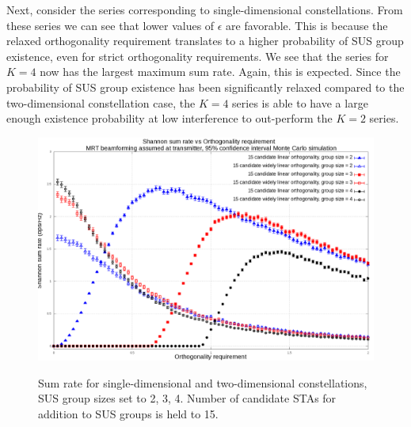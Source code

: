 Next, consider the series corresponding to single-dimensional constellations. From these series we can see that lower values of $\epsilon$ are favorable. This is because the relaxed orthogonality requirement translates to a higher probability of SUS group existence, even for strict orthogonality requirements. We see  that the series for $K=4$ now has the largest maximum sum rate. Again, this is expected. Since the probability of SUS group existence has been significantly relaxed compared to the two-dimensional constellation case, the $K=4$ series is able to have a large enough existence probability at low interference to out-perform the $K=2$ series.

\begin{figure}
    \centering
    \includegraphics[width=24cm]{figs/15_candidate_mrt.png}\\
    \caption{Sum rate for single-dimensional and two-dimensional constellations, SUS group sizes set to 2, 3, 4. Number of candidate STAs for addition to SUS groups is held to 15.}
    \label{fig:15_candidate}
\end{figure}

